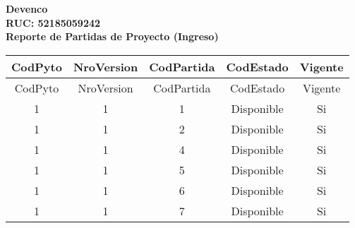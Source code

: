 \documentclass[a4paper]{article}
\begin{document}
\begin{center}
\vspace{0.5cm}
\textbf{\Huge Devenco}\\ %
\vspace{0.2cm}
\textbf{\Large RUC: 52185059242}\\ %
\vspace{1cm}
\textbf{\Large Reporte de Partidas de Proyecto (Ingreso)}
\end{center}
\vspace{1cm}
\begin{center}
\begin{longtable}{|c|c|c|c|c|}
\hline
CodPyto & NroVersion & CodPartida & CodEstado & Vigente \\
\hline
\endfirsthead
\hline
CodPyto & NroVersion & CodPartida & CodEstado & Vigente \\
\hline
\endhead
1 & 1 & 1 & Disponible & Si \\
1 & 1 & 2 & Disponible & Si \\
1 & 1 & 4 & Disponible & Si \\
1 & 1 & 5 & Disponible & Si \\
1 & 1 & 6 & Disponible & Si \\
1 & 1 & 7 & Disponible & Si \\
\hline
\end{longtable}
\end{center}
\end{document}
